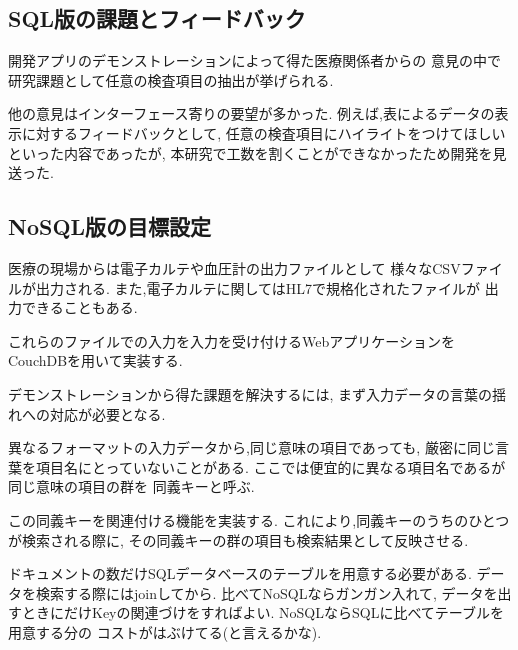 \subsection{SQL版の課題とフィードバック}

  開発アプリのデモンストレーションによって得た医療関係者からの
  意見の中で研究課題として任意の検査項目の抽出が挙げられる.

  他の意見はインターフェース寄りの要望が多かった.
  例えば,表によるデータの表示に対するフィードバックとして,
  任意の検査項目にハイライトをつけてほしいといった内容であったが,
  本研究で工数を割くことができなかったため開発を見送った.


\subsection{NoSQL版の目標設定}
  医療の現場からは電子カルテや血圧計の出力ファイルとして
  様々なCSVファイルが出力される.
  また,電子カルテに関してはHL7で規格化されたファイルが
  出力できることもある.

  これらのファイルでの入力を入力を受け付けるWebアプリケーションを
  CouchDBを用いて実装する.


  デモンストレーションから得た課題を解決するには,
  まず入力データの言葉の揺れへの対応が必要となる.

  異なるフォーマットの入力データから,同じ意味の項目であっても,
  厳密に同じ言葉を項目名にとっていないことがある.
  ここでは便宜的に異なる項目名であるが同じ意味の項目の群を
  同義キーと呼ぶ.

  この同義キーを関連付ける機能を実装する.
  これにより,同義キーのうちのひとつが検索される際に,
  その同義キーの群の項目も検索結果として反映させる.





  ドキュメントの数だけSQLデータベースのテーブルを用意する必要がある.
  データを検索する際にはjoinしてから.
  比べてNoSQLならガンガン入れて,
  データを出すときにだけKeyの関連づけをすればよい.
  NoSQLならSQLに比べてテーブルを用意する分の
  コストがはぶけてる(と言えるかな).
  \fi

